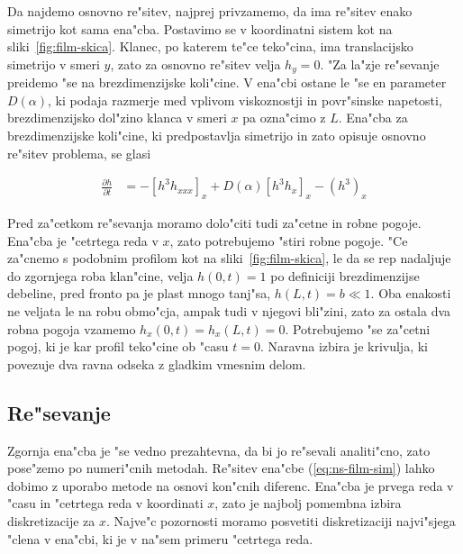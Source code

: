 \documentclass[a4paper,10pt]{article}
\newcommand{\odv}[1]{\frac{\partial #1}{\partial t}}
\begin{document}
Da najdemo osnovno re"sitev, najprej privzamemo, da ima re"sitev enako simetrijo kot sama ena"cba. Postavimo se v koordinatni sistem kot na sliki~\ref{fig:film-skica}. Klanec, po katerem te"ce teko"cina, ima translacijsko simetrijo v smeri $y$, zato za osnovno re"sitev velja $h_y = 0$. "Za la"zje re"sevanje preidemo "se na brezdimenzijske koli"cine. V ena"cbi ostane le "se en parameter $D(\alpha)$, ki podaja razmerje med vplivom viskoznostji in povr"sinske napetosti, brezdimenzijsko dol"zino klanca v smeri $x$ pa ozna"cimo z $L$. Ena"cba za brezdimenzijske koli"cine, ki predpostavlja simetrijo in zato opisuje osnovno re"sitev problema, se glasi


\begin{align}
  \label{eq:ns-film-sim}
 \odv{h} &= - \left[h^3 h_{xxx}\right]_x + D(\alpha) \left[h^3 h_x\right]_x - \left(h^3\right)_x
\end{align}

Pred za"cetkom re"sevanja moramo dolo"citi tudi za"cetne in robne pogoje. Ena"cba je "cetrtega reda v $x$, zato potrebujemo "stiri robne pogoje. "Ce za"cnemo s podobnim profilom kot na sliki~\ref{fig:film-skica}, le da se rep nadaljuje do zgornjega roba klan"cine, velja $h(0, t) = 1$ po definiciji brezdimenzijse debeline, pred fronto pa je plast mnogo tanj"sa, $h(L, t) = b \ll 1$. Oba enakosti ne veljata le na robu obmo"cja, ampak tudi v njegovi bli"zini, zato za ostala dva robna pogoja vzamemo $h_x(0,t) = h_x(L,t) = 0$. Potrebujemo "se za"cetni pogoj, ki je kar profil teko"cine ob "casu $t=0$. Naravna izbira je krivulja, ki povezuje dva ravna odseka z gladkim vmesnim delom. 

\subsection{Re"sevanje}

Zgornja ena"cba je "se vedno prezahtevna, da bi jo re"sevali analiti"cno, zato pose"zemo po numeri"cnih metodah. Re"sitev ena"cbe (\ref{eq:ns-film-sim}) lahko dobimo z uporabo metode na osnovi kon"cnih diferenc. Ena"cba je prvega reda v "casu in "cetrtega reda v koordinati $x$, zato je najbolj pomembna izbira diskretizacije za $x$. Najve"c pozornosti moramo posvetiti diskretizaciji najvi"sjega "clena v ena"cbi, ki je v na"sem primeru "cetrtega reda. 
\end{document}

